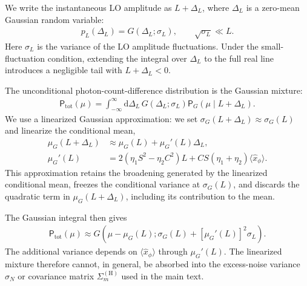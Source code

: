 \documentclass[%
final, 
superscriptaddress,
 amsmath,amssymb,amsfonts,
 aps,
 pra,
 longbibliography,
]{revtex4-2}
\newcommand{\avr}[1]{\ensuremath{\langle{#1}\rangle}}
\newcommand{\ind}[1]{\mathrm{#1}}
\newcommand{\prob}{\mathsf{P}}
\newcommand{\dd}{\mathrm{d}}
\begin{document}
We write the instantaneous LO amplitude as $L+\Delta_L$, where $\Delta_L$ is a zero-mean Gaussian random variable:
\begin{align}
  p_L(\Delta_L)=G(\Delta_L;\sigma_L),
  \qquad \sqrt{\sigma_L}\ll L.
\end{align}
Here $\sigma_L$ is the variance of the LO amplitude fluctuations. Under the small-fluctuation condition, extending the integral over $\Delta_L$ to the full real line introduces a negligible tail with $L+\Delta_L<0$.

The unconditional photon-count-difference distribution is the Gaussian mixture:%
\begin{align}
    \label{eq:average-integral}
    \prob_{\ind{tot}}(\mu)
    =\int_{-\infty}^{\infty}\dd\Delta_L\,
    G(\Delta_L;\sigma_L)\prob_G(\mu\mid L+\Delta_L).
\end{align}
We use a linearized Gaussian approximation: we set $\sigma_G(L+\Delta_L)\approx\sigma_G(L)$ and linearize the conditional mean,
\begin{align}
  \mu_G(L+\Delta_L)
  &\approx \mu_G(L)+\mu_G'(L)\Delta_L,\\
  \mu_G'(L)
  &=2(\eta_1S^2-\eta_2C^2)L
  +CS(\eta_1+\eta_2)\avr{\hat{x}_\phi}.
\end{align}
This approximation retains the broadening generated by the linearized conditional mean, freezes the conditional variance at $\sigma_G(L)$, and discards the quadratic term in $\mu_G(L+\Delta_L)$, including its contribution to the mean.

The Gaussian integral then gives
\begin{align}
  \prob_{\ind{tot}}(\mu)
  \approx
  G\!\left(
    \mu-\mu_G(L);
    \sigma_G(L)+[\mu_G'(L)]^2\sigma_L
  \right).
\end{align}
The additional variance depends on
$\avr{\hat{x}_\phi}$
through
$\mu_G'(L)$.
The linearized mixture therefore cannot, in general, be absorbed into the excess-noise variance
$\sigma_N$
or covariance matrix
$\Sigma_m^{(\ind{H})}$
used in the main text.
\end{document}
